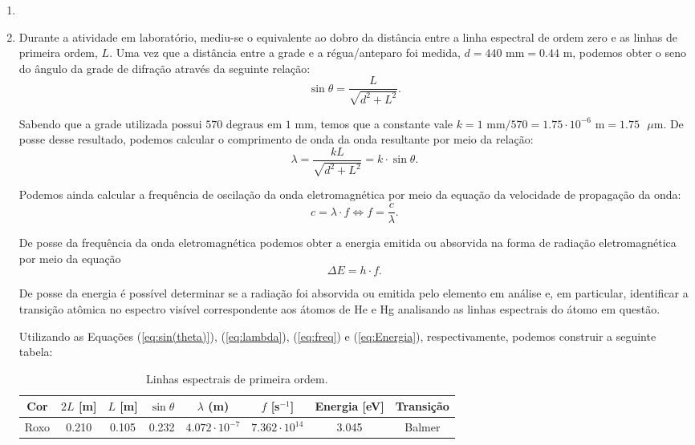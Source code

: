 \documentclass[12pt,a4paper]{article}
\begin{document}
\begin{enumerate}
    
    \item


        
    \item Durante a atividade em laboratório, mediu-se o equivalente ao dobro da distância entre a linha espectral de ordem zero e as linhas de primeira ordem, $L$. Uma vez que a distância entre a grade e a régua/anteparo foi medida, $d=440\text{ mm}=0.44\text{ m}$, podemos obter o seno do ângulo da grade de difração através da seguinte relação:
    \begin{equation} \label{eq:sin(theta)}
        \sin\theta=\frac{L}{\sqrt{d^{2}+L^{2}}}.
    \end{equation}

    Sabendo que a grade utilizada possui $570$ degraus em $1$ mm, temos que a constante vale $k=1\text{ mm}/570=1.75\cdot10^{-6}\text{ m}=1.75\text{ }\mu\text{m}$. De posse desse resultado, podemos calcular o comprimento de onda da onda resultante por meio da relação:
    \begin{equation} \label{eq:lambda}
        \lambda=\frac{kL}{\sqrt{d^{2}+L^{2}}}=k\cdot\sin\theta.
    \end{equation}

    Podemos ainda calcular a frequência de oscilação da onda eletromagnética por meio da equação da velocidade de propagação da onda:
    \begin{equation} \label{eq:freq}
        c=\lambda\cdot f\iff f=\frac{c}{\lambda}.
    \end{equation}

    De posse da frequência da onda eletromagnética podemos obter a energia emitida ou absorvida na forma de radiação eletromagnética por meio da equação
    \begin{equation} \label{eq:Energia}
        \Delta E=h\cdot f.
    \end{equation}

    De posse da energia é possível determinar se a radiação foi absorvida ou emitida pelo elemento em análise e, em particular, identificar a transição atômica no espectro visível correspondente aos átomos de He e Hg analisando as linhas espectrais do átomo em questão.

    Utilizando as Equações (\ref{eq:sin(theta)}), (\ref{eq:lambda}), (\ref{eq:freq}) e (\ref{eq:Energia}), respectivamente, podemos construir a seguinte tabela:
    \begin{table}[htb!]
        \centering
        \caption{Linhas espectrais de primeira ordem.}
        \begin{tabular}{|c|c|c|c|c|c|c|c|}
            \hline
            Cor & $2L$ [m] & $L$ [m] & $\sin{\theta}$ & $\lambda$ (m) & $f$ [s$^{-1}$] & Energia [eV] & Transição \\
            \hline
            Roxo & 0.210 & 0.105 & 0.232 & $4.072\cdot10^{-7}$ & $7.362\cdot10^{14}$ & 3.045 & Balmer \\
            

\end{tabular}
\end{table}
\end{enumerate}
\end{document}
